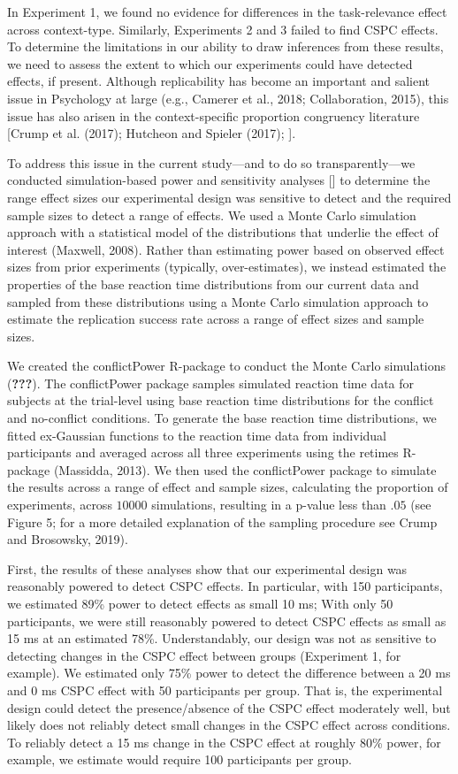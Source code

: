 \documentclass[english,,man,floatsintext]{apa6}
\begin{document}
In Experiment 1, we found no evidence for differences in the task-relevance effect across context-type. Similarly, Experiments 2 and 3 failed to find CSPC effects. To determine the limitations in our ability to draw inferences from these results, we need to assess the extent to which our experiments could have detected effects, if present. Although replicability has become an important and salient issue in Psychology at large (e.g., Camerer et al., 2018; Collaboration, 2015), this issue has also arisen in the context-specific proportion congruency literature {[}Crump et al. (2017); Hutcheon and Spieler (2017); {]}.

To address this issue in the current study---and to do so transparently---we conducted simulation-based power and sensitivity analyses {[}{]} to determine the range effect sizes our experimental design was sensitive to detect and the required sample sizes to detect a range of effects. We used a Monte Carlo simulation approach with a statistical model of the distributions that underlie the effect of interest (Maxwell, 2008). Rather than estimating power based on observed effect sizes from prior experiments (typically, over-estimates), we instead estimated the properties of the base reaction time distributions from our current data and sampled from these distributions using a Monte Carlo simulation approach to estimate the replication success rate across a range of effect sizes and sample sizes.

We created the conflictPower R-package to conduct the Monte Carlo simulations ({\textbf{???}}). The conflictPower package samples simulated reaction time data for subjects at the trial-level using base reaction time distributions for the conflict and no-conflict conditions. To generate the base reaction time distributions, we fitted ex-Gaussian functions to the reaction time data from individual participants and averaged across all three experiments using the retimes R-package (Massidda, 2013). We then used the conflictPower package to simulate the results across a range of effect and sample sizes, calculating the proportion of experiments, across \(10 000\) simulations, resulting in a p-value less than \(.05\) (see Figure 5; for a more detailed explanation of the sampling procedure see Crump and Brosowsky, 2019).

First, the results of these analyses show that our experimental design was reasonably powered to detect CSPC effects. In particular, with 150 participants, we estimated 89\% power to detect effects as small 10 ms; With only 50 participants, we were still reasonably powered to detect CSPC effects as small as 15 ms at an estimated 78\%. Understandably, our design was not as sensitive to detecting changes in the CSPC effect between groups (Experiment 1, for example). We estimated only 75\% power to detect the difference between a 20 ms and 0 ms CSPC effect with 50 participants per group. That is, the experimental design could detect the presence/absence of the CSPC effect moderately well, but likely does not reliably detect small changes in the CSPC effect across conditions. To reliably detect a 15 ms change in the CSPC effect at roughly 80\% power, for example, we estimate would require 100 participants per group.
\end{document}
